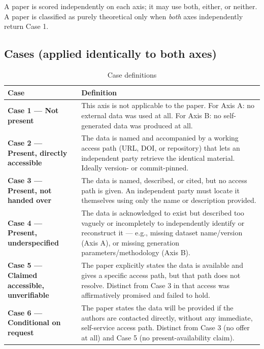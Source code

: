 \documentclass[11pt]{article}
\begin{document}
A paper is scored independently on each axis; it may use both, either, or neither. A
paper is classified as purely theoretical only when \emph{both} axes independently
return Case 1.

\subsection{Cases (applied identically to both axes)}

\begin{table}[htbp]
\centering
\caption{Case definitions}
\label{tab:cases}
\begin{tabular}{@{}>{\bfseries}p{2.6cm} p{10.5cm}@{}}
\toprule
Case & Definition \\
\midrule
Case 1 --- Not present &
This axis is not applicable to the paper. For Axis A: no external data was used at
all. For Axis B: no self-generated data was produced at all. \\
\addlinespace
Case 2 --- Present, directly accessible &
The data is named and accompanied by a working access path (URL, DOI, or repository)
that lets an independent party retrieve the identical material. Ideally version- or
commit-pinned. \\
\addlinespace
Case 3 --- Present, not handed over &
The data is named, described, or cited, but no access path is given. An independent
party must locate it themselves using only the name or description provided. \\
\addlinespace
Case 4 --- Present, underspecified &
The data is acknowledged to exist but described too vaguely or incompletely to
independently identify or reconstruct it --- e.g., missing dataset name/version (Axis
A), or missing generation parameters/methodology (Axis B). \\
\addlinespace
Case 5 --- Claimed accessible, unverifiable &
The paper explicitly states the data is available and gives a specific access path,
but that path does not resolve. Distinct from Case 3 in that access was affirmatively
promised and failed to hold. \\
\addlinespace
Case 6 --- Conditional on request &
The paper states the data will be provided if the authors are contacted directly,
without any immediate, self-service access path. Distinct from Case 3 (no offer at
all) and Case 5 (no present-availability claim). \\
\bottomrule
\end{tabular}
\end{table}
\end{document}
